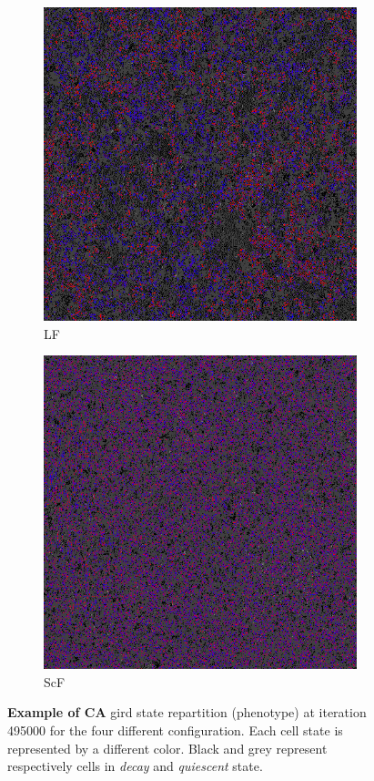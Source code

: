 \begin{figure}
\begin{subfigure}{.25\textwidth}
  \centering
  \includegraphics[width=.9\linewidth]{img/light495000}
  \caption{LF}
\end{subfigure}%
\begin{subfigure}{.25\textwidth}
  \centering
  \includegraphics[width=.9\linewidth]{img/small495000}
  \caption{ScF}
\end{subfigure}
\caption{\textbf{Example of CA} gird state repartition (phenotype) at iteration 495000 for the four different configuration. Each cell state is represented by a different color. Black and grey represent respectively cells in \emph{decay} and \emph{quiescent} state.}
\label{fig:phenoexpl}
\end{figure}

